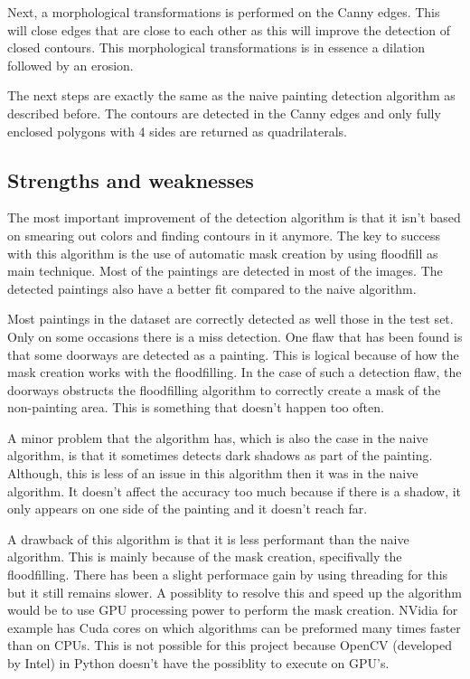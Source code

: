 Next, a morphological transformations is performed on the Canny edges. This will close edges that are close to each other as this will improve the detection of closed contours. This morphological transformations is in essence a dilation followed by an erosion.

The next steps are exactly the same as the naive painting detection algorithm as described before. The contours are detected in the Canny edges and only fully enclosed polygons with 4 sides are returned as quadrilaterals.

\subsection{Strengths and weaknesses}

The most important improvement of the detection algorithm is that it isn't based on smearing out colors and finding contours in it anymore. The key to success with this algorithm is the use of automatic mask creation by using floodfill as main technique. Most of the paintings are detected in most of the images. The detected paintings also have a better fit compared to the naive algorithm.

Most paintings in the dataset are correctly detected as well those in the test set. Only on some occasions there is a miss detection. One flaw that has been found is that some doorways are detected as a painting. This is logical because of how the mask creation works with the floodfilling. In the case of such a detection flaw, the doorways obstructs the floodfilling algorithm to correctly create a mask of the non-painting area. This is something that doesn't happen too often.

A minor problem that the algorithm has, which is also the case in the naive algorithm, is that it sometimes detects dark shadows as part of the painting. Although, this is less of an issue in this algorithm then it was in the naive algorithm. It doesn't affect the accuracy too much because if there is a shadow, it only appears on one side of the painting and it doesn't reach far.

A drawback of this algorithm is that it is less performant than the naive algorithm. This is mainly because of the mask creation, specifivally the floodfilling. There has been a slight performace gain by using threading for this but it still remains slower. A possiblity to resolve this and speed up the algorithm would be to use GPU processing power to perform the mask creation. NVidia for example has Cuda cores on which algorithms can be preformed many times faster than on CPUs. This is not possible for this project because OpenCV (developed by Intel) in Python doesn't have the possiblity to execute on GPU's.

